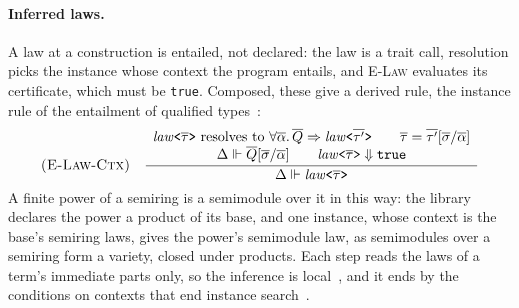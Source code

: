 \paragraph{Inferred laws.}
\label{app:fjlt:inferred}
A law at a construction is entailed, not declared: the law is a trait call, resolution picks the instance whose context the program entails, and \textsc{E-Law} evaluates its certificate, which must be \texttt{true}.
Composed, these give a derived rule, the instance rule of the entailment of qualified types~\cite{jones1994qualified}:
\[
\textsc{(E-Law-Ctx)}\quad \dfrac{\begin{array}{c} \mathit{law}\texttt{<}\overline{\tau}\texttt{>} \text{ resolves to } \forall\overline{\alpha}.\,\overline{Q} \Rightarrow \mathit{law}\texttt{<}\overline{\tau'}\texttt{>} \qquad \overline{\tau} = \overline{\tau'}[\overline{\sigma}/\overline{\alpha}] \\ \Delta \Vdash \overline{Q}[\overline{\sigma}/\overline{\alpha}] \qquad \mathit{law}\texttt{<}\overline{\tau}\texttt{>} \Downarrow \texttt{true} \end{array}}{\Delta \Vdash \mathit{law}\texttt{<}\overline{\tau}\texttt{>}}
\]
A finite power of a semiring is a semimodule over it in this way: the library declares the power a product of its base, and one instance, whose context is the base's semiring laws, gives the power's semimodule law, as semimodules over a semiring form a variety, closed under products.
Each step reads the laws of a term's immediate parts only, so the inference is local~\cite{pierce2000local}, and it ends by the conditions on contexts that end instance search~\cite{sulzmann2007understanding}.
